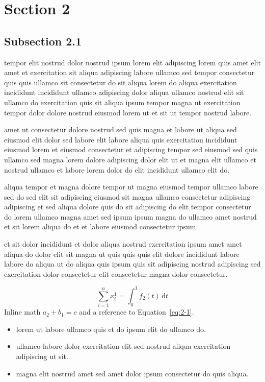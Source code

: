 \documentclass{article}
\begin{document}
\section{Section 2}\label{sec:2}
\subsection{Subsection 2.1}\label{sec:2-1}
tempor elit nostrud dolor nostrud ipsum lorem elit adipiscing lorem quis amet elit amet et exercitation sit aliqua adipiscing labore ullamco sed tempor consectetur quis quis ullamco sit consectetur do sit aliqua lorem do aliqua exercitation incididunt incididunt ullamco adipiscing dolor aliqua ullamco nostrud elit sit ullamco do exercitation quis sit aliqua ipsum tempor magna ut exercitation tempor dolor dolore nostrud eiusmod lorem ut et sit ut tempor nostrud labore.

amet ut consectetur dolore nostrud sed quis magna et labore ut aliqua sed eiusmod elit dolor sed labore elit labore aliqua quis exercitation incididunt eiusmod lorem et eiusmod consectetur et adipiscing tempor sed eiusmod sed quis ullamco sed magna lorem dolore adipiscing dolor elit ut et magna elit ullamco et nostrud ullamco et labore lorem dolor do elit incididunt ullamco elit do.

aliqua tempor et magna dolore tempor ut magna eiusmod tempor ullamco labore sed do sed elit sit adipiscing eiusmod sit magna ullamco consectetur adipiscing adipiscing et sed aliqua dolore quis do sit adipiscing do elit tempor consectetur do lorem ullamco magna amet sed ipsum ipsum magna do ullamco amet nostrud et sit lorem aliqua do et et labore eiusmod consectetur ipsum.

et sit dolor incididunt et dolor aliqua nostrud exercitation ipsum amet amet aliqua do dolor elit sit magna ut quis quis quis elit dolore incididunt labore labore do aliqua ut do aliqua quis ipsum quis sit adipiscing nostrud adipiscing sed exercitation dolor consectetur elit consectetur magna dolor consectetur.

\begin{equation}\label{eq:2-1}
  \sum_{i=1}^{n} x_i^{1} = \int_0^1 f_{2}(t)\,\mathrm{d}t
\end{equation}
Inline math $a_{2} + b_{1} = c$ and a reference to Equation~\eqref{eq:2-1}.

\begin{itemize}
  \item lorem ut labore ullamco quis et do ipsum elit do ullamco do.
  \item ullamco labore dolor exercitation elit sed nostrud aliqua exercitation adipiscing ut sit.
  \item magna elit nostrud amet sed amet dolor ipsum consectetur do quis aliqua.
\end{itemize}
\end{document}

